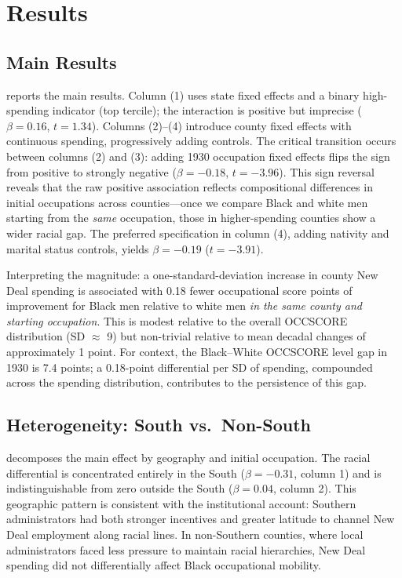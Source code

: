 \documentclass[12pt]{article}
\begin{document}
\section{Results}

\subsection{Main Results}



 reports the main results. Column (1) uses state fixed effects and a binary high-spending indicator (top tercile); the interaction is positive but imprecise ($\beta = 0.16$, $t = 1.34$). Columns (2)--(4) introduce county fixed effects with continuous spending, progressively adding controls. The critical transition occurs between columns (2) and (3): adding 1930 occupation fixed effects flips the sign from positive to strongly negative ($\beta = -0.18$, $t = -3.96$). This sign reversal reveals that the raw positive association reflects compositional differences in initial occupations across counties---once we compare Black and white men starting from the \textit{same} occupation, those in higher-spending counties show a wider racial gap. The preferred specification in column (4), adding nativity and marital status controls, yields $\beta = -0.19$ ($t = -3.91$).

Interpreting the magnitude: a one-standard-deviation increase in county New Deal spending is associated with 0.18 fewer occupational score points of improvement for Black men relative to white men \textit{in the same county and starting occupation}. This is modest relative to the overall OCCSCORE distribution (SD $\approx$ 9) but non-trivial relative to mean decadal changes of approximately 1 point. For context, the Black--White OCCSCORE level gap in 1930 is 7.4 points; a 0.18-point differential per SD of spending, compounded across the spending distribution, contributes to the persistence of this gap.

\subsection{Heterogeneity: South vs.\ Non-South}



 decomposes the main effect by geography and initial occupation. The racial differential is concentrated entirely in the South ($\beta = -0.31$, column 1) and is indistinguishable from zero outside the South ($\beta = 0.04$, column 2). This geographic pattern is consistent with the institutional account: Southern administrators had both stronger incentives and greater latitude to channel New Deal employment along racial lines. In non-Southern counties, where local administrators faced less pressure to maintain racial hierarchies, New Deal spending did not differentially affect Black occupational mobility.
\end{document}

